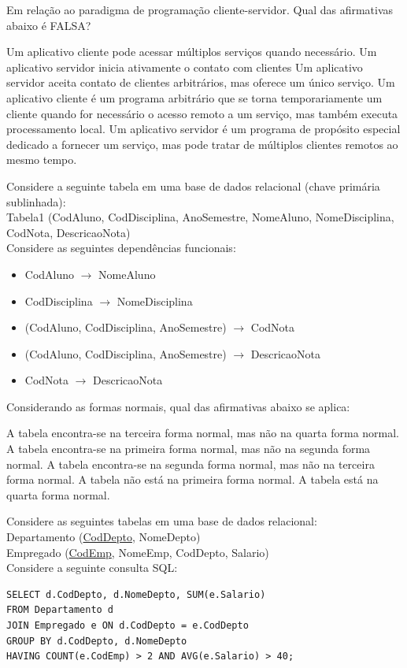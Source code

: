 \documentclass[12pt, addpoints]{exam}
\begin{document}
\begin{questions}
\question
Em relação ao paradigma de programação cliente-servidor. Qual das afirmativas abaixo é FALSA?
\begin{choices}
\choice Um aplicativo cliente pode acessar múltiplos serviços quando necessário.
\choice Um aplicativo servidor inicia ativamente o contato com clientes 
\choice Um aplicativo servidor aceita contato de clientes arbitrários, mas oferece um único serviço. 
\choice Um aplicativo cliente é um programa arbitrário que se torna temporariamente um cliente quando for necessário o acesso remoto a um serviço, mas também executa processamento local.
\choice Um aplicativo servidor é um programa de propósito especial dedicado a fornecer um serviço, mas pode tratar de múltiplos clientes remotos ao mesmo tempo. 
\end{choices}

\question
Considere a seguinte tabela em uma base de dados relacional (chave primária sublinhada):\\
Tabela1 (CodAluno, CodDisciplina, AnoSemestre, NomeAluno, NomeDisciplina, CodNota, DescricaoNota)\\
Considere as seguintes dependências funcionais:
\begin{itemize}
    \item CodAluno \(\rightarrow\) NomeAluno
    \item CodDisciplina \(\rightarrow\) NomeDisciplina
    \item (CodAluno, CodDisciplina, AnoSemestre) \(\rightarrow\) CodNota
    \item (CodAluno, CodDisciplina, AnoSemestre) \(\rightarrow\) DescricaoNota
    \item CodNota \(\rightarrow\) DescricaoNota
\end{itemize}

Considerando as formas normais, qual das afirmativas abaixo se aplica:
\begin{choices}
\choice A tabela encontra-se na terceira forma normal, mas não na quarta forma normal.
\choice A tabela encontra-se na primeira forma normal, mas não na segunda forma normal.
\choice A tabela encontra-se na segunda forma normal, mas não na terceira forma normal.
\choice A tabela não está na primeira forma normal.
\choice A tabela está na quarta forma normal.
\end{choices}

\question
Considere as seguintes tabelas em uma base de dados relacional:\\
Departamento (\underline{CodDepto}, NomeDepto)\\
Empregado (\underline{CodEmp}, NomeEmp, CodDepto, Salario)\\
Considere a seguinte consulta SQL:
\begin{verbatim}
SELECT d.CodDepto, d.NomeDepto, SUM(e.Salario)
FROM Departamento d
JOIN Empregado e ON d.CodDepto = e.CodDepto
GROUP BY d.CodDepto, d.NomeDepto
HAVING COUNT(e.CodEmp) > 2 AND AVG(e.Salario) > 40;
\end{verbatim}


\end{questions}
\end{document}
